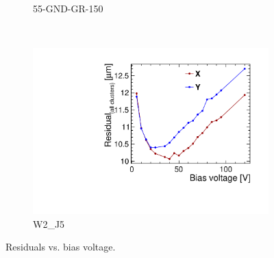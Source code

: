 \begin{figure}[htbp]
\begin{subfigure}[b]{0.33\textwidth}
    \caption{55-GND-GR-150}
  \end{subfigure}\\
  \begin{subfigure}[b]{0.33\textwidth}
    \includegraphics[width=\textwidth]{./figures/TestBeam/W2_J5_Residual_vs_bias.pdf}
    \caption{W2\_J5}
  \end{subfigure}
  \caption{Residuals vs. bias voltage.}
  \label{fig:Residuals_vs_biasVoltage}
\end{figure}

